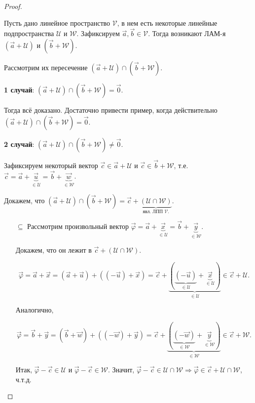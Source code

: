 \begin{proof}~

    Пусть дано линейное пространство $\mathcal{V}$, в нем есть некоторые линейные подпространства $\mathcal{U}$ и $\mathcal{W}$. Зафиксируем $\vec{a}, \vec{b} \in \mathcal{V}$. Тогда возникают ЛАМ-я $(\vec{a} + \mathcal{U})$ и $(\vec{b} + \mathcal{W})$.

    Рассмотрим их пересечение $(\vec{a} + \mathcal{U}) \cap (\vec{b} + \mathcal{W})$.

    \textbf{1 случай}: $(\vec{a} + \mathcal{U}) \cap (\vec{b} + \mathcal{W}) = \vec{0}$.

    Тогда всё доказано. Достаточно привести пример, когда действительно $(\vec{a} + \mathcal{U}) \cap (\vec{b} + \mathcal{W}) = \vec{0}$.

    \bigbreak

    \textbf{2 случай}: $(\vec{a} + \mathcal{U}) \cap (\vec{b} + \mathcal{W}) \ne \vec{0}$.

    Зафиксируем некоторый вектор $\vec{c} \in \vec{a} + \mathcal{U}$ и $\vec{c} \in \vec{b} + \mathcal{W}$, т.е. $\vec{c} = \vec{a} + \underbrace{\vec{u}}_{\in \mathcal{U}} = \vec{b} + \underbrace{\vec{w}}_{\in \mathcal{W}}$.

    Докажем, что $(\vec{a} + \mathcal{U}) \cap (\vec{b} + \mathcal{W}) = \vec{c} + \underbrace{(\mathcal{U} \cap \mathcal{W})}_{\text{явл. ЛПП } \mathcal{V}.}$.

    \begin{enumerate}
        \item[$\subseteq$] Рассмотрим произвольный вектор $\vec{\varphi} = \vec{a} + \underbrace{\vec{x}}_{\in \mathcal{U}} =\vec{b} + \underbrace{\vec{y}}_{\in \mathcal{W}}.$
    
        Докажем, что он лежит в $\vec{c} + (\mathcal{U} \cap \mathcal{W})$.
    
        $$\vec{\varphi} = \vec{a} + \vec{x} = (\vec{a} + \vec{u}) + ((-\vec{u}) + \vec{x}) = \vec{c} + \underbrace{(\underbrace{(-\vec{u})}_{\in \mathcal{U}} + \underbrace{\vec{x}}_{\in \mathcal{U}})}_{\in \mathcal{U}} \in \vec{c} +\mathcal{U}.$$
    
        Аналогично,
    
        $$\vec{\varphi} = \vec{b} + \vec{y} = (\vec{b} + \vec{w}) + ((-\vec{w}) + \vec{y}) = \vec{c} + \underbrace{(\underbrace{(-\vec{w})}_{\in \mathcal{W}} + \underbrace{\vec{y}}_{\in \mathcal{W}})}_{\in \mathcal{W}} \in \vec{c} +\mathcal{W}.$$
    
        Итак, $\vec{\varphi} - \vec{c} \in \mathcal{U}$ и $\vec{\varphi} - \vec{c} \in \mathcal{W}$. Значит, $\vec{\varphi} - \vec{c} \in \mathcal{U} \cap \mathcal{W} \Rightarrow \vec{\varphi} \in \vec{c} + \mathcal{U} \cap \mathcal{W}$, ч.т.д.
        

\end{enumerate}
\end{proof}

